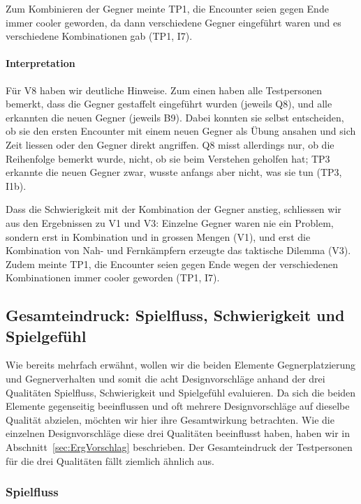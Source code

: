 \documentclass[../Main.tex]{subfiles}
\begin{document}
Zum Kombinieren der Gegner meinte TP1, die Encounter seien gegen Ende immer cooler geworden, da dann verschiedene Gegner eingeführt waren und es verschiedene Kombinationen gab (TP1, I7).

\paragraph{Interpretation}
Für V8 haben wir deutliche Hinweise. Zum einen haben alle Testpersonen bemerkt, dass die Gegner gestaffelt eingeführt wurden (jeweils Q8), und alle erkannten die neuen Gegner (jeweils B9). Dabei konnten sie selbst entscheiden, ob sie den ersten Encounter mit einem neuen Gegner als Übung ansahen und sich Zeit liessen oder den Gegner direkt angriffen. Q8 misst allerdings nur, ob die Reihenfolge bemerkt wurde, nicht, ob sie beim Verstehen geholfen hat; TP3 erkannte die neuen Gegner zwar, wusste anfangs aber nicht, was sie tun (TP3, I1b).

Dass die Schwierigkeit mit der Kombination der Gegner anstieg, schliessen wir aus den Ergebnissen zu V1 und V3: Einzelne Gegner waren nie ein Problem, sondern erst in Kombination und in grossen Mengen (V1), und erst die Kombination von Nah- und Fernkämpfern erzeugte das taktische Dilemma (V3). Zudem meinte TP1, die Encounter seien gegen Ende wegen der verschiedenen Kombinationen immer cooler geworden (TP1, I7).

\subsection{Gesamteindruck: Spielfluss, Schwierigkeit und Spielgefühl} \label{sec:Gesamteindruck} \label{sec:ErgAllgemein}

Wie bereits mehrfach erwähnt, wollen wir die beiden Elemente Gegnerplatzierung und Gegnerverhalten und somit die acht Designvorschläge anhand der drei Qualitäten Spielfluss, Schwierigkeit und Spielgefühl evaluieren. Da sich die beiden Elemente gegenseitig beeinflussen und oft mehrere Designvorschläge auf dieselbe Qualität abzielen, möchten wir hier ihre Gesamtwirkung betrachten. Wie die einzelnen Designvorschläge diese drei Qualitäten beeinflusst haben, haben wir in Abschnitt~\ref{sec:ErgVorschlag} beschrieben. Der Gesamteindruck der Testpersonen für die drei Qualitäten fällt ziemlich ähnlich aus.

\subsubsection{Spielfluss}
\end{document}
